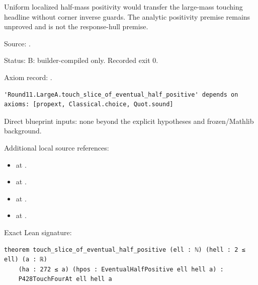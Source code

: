 \begin{theorem}[bp-237]
\label{bp-237}
\uses{}
\leanok
Uniform localized half-mass positivity would transfer the large-mass touching headline without corner inverse guards. The analytic positivity premise remains unproved and is not the response-hull premise.

\par Source: \texttt{}.
\par Status: B: builder-compiled only. Recorded exit 0.
\par Axiom record: \texttt{}.
\begin{verbatim}
'Round11.LargeA.touch_slice_of_eventual_half_positive' depends on axioms: [propext, Classical.choice, Quot.sound]
\end{verbatim}
\par Direct blueprint inputs: none beyond the explicit hypotheses and frozen/Mathlib background.
\par Additional local source references:
\begin{itemize}
\item \texttt{} at \texttt{}.
\item \texttt{} at \texttt{}.
\item \texttt{} at \texttt{}.
\item \texttt{} at \texttt{}.
\end{itemize}
\par Exact Lean signature:
\begin{verbatim}
theorem touch_slice_of_eventual_half_positive (ell : ℕ) (hell : 2 ≤ ell) (a : ℝ)
    (ha : 272 ≤ a) (hpos : EventualHalfPositive ell hell a) :
    P428TouchFourAt ell hell a
\end{verbatim}
\end{theorem}

